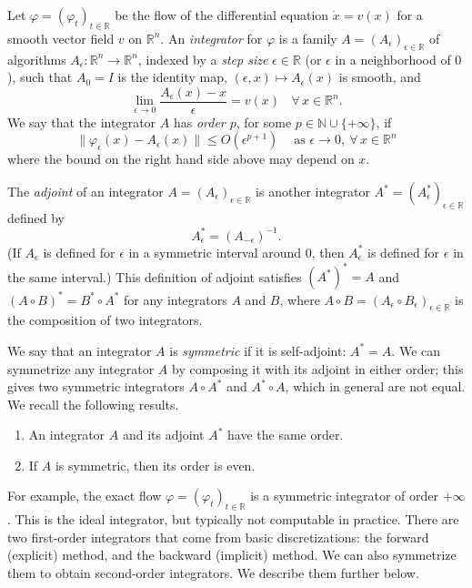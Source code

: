 \documentclass[final,12pt]{colt2018}
\newcommand{\R}{\mathbb{R}}
\newcommand{\bN}{\mathbb{N}}
\begin{document}
Let $\varphi = (\varphi_t)_{t \in \R}$ be the flow of the differential equation $\dot x = v(x)$ for a smooth vector field $v$ on $\R^n$.
An {\em integrator} for $\varphi$ is a family $A = (A_\epsilon)_{\epsilon \in \R}$ of algorithms $A_\epsilon \colon \R^n \to \R^n$, indexed by a {\em step size} $\epsilon \in \R$ (or $\epsilon$ in a neighborhood of $0$), such that
$A_0 = I$ is the identity map, $(\epsilon,x) \mapsto A_\epsilon(x)$ is smooth, and 
$$\lim_{\epsilon \to 0} \frac{A_\epsilon(x)-x}{\epsilon} = v(x) ~~~~ \forall \, x \in \R^n.$$
We say that the integrator $A$ has {\em order $p$}, for some $p \in \bN \cup \{+\infty\}$, if
$$\|\varphi_\epsilon(x) - A_\epsilon(x)\| \le O(\epsilon^{p+1})~~~~\text{ as } \epsilon \to 0, ~ \forall\, x \in \R^n$$
where the bound on the right hand side above may depend on $x$.

The {\em adjoint} of an integrator $A = (A_\epsilon)_{\epsilon \in \R}$ is another integrator $A^\ast = (A_\epsilon^\ast)_{\epsilon \in \R}$ defined by
$$A_\epsilon^\ast = (A_{-\epsilon})^{-1}.$$
(If $A_\epsilon$ is defined for $\epsilon$ in a symmetric interval around $0$, then $A_\epsilon^\ast$ is defined for $\epsilon$ in the same interval.)
This definition of adjoint satisfies $(A^\ast)^\ast = A$ and $(A \circ B)^\ast = B^\ast \circ A^\ast$ for any integrators $A$ and $B$, where $A \circ B = (A_{\epsilon} \circ B_{\epsilon})_{\epsilon \in \R}$ is the composition of two integrators. 

We say that an integrator $A$ is {\em symmetric} if it is self-adjoint: $A^\ast = A.$
We can symmetrize any integrator $A$ by composing it with its adjoint in either order; this gives two symmetric integrators $A \circ A^\ast$ and $A^\ast \circ A$, which in general are not equal.
We recall the following results.

\begin{lemma}
\label{Lem:Int}
\begin{enumerate}
\item An integrator $A$ and its adjoint $A^\ast$ have the same order.
\item If $A$ is symmetric, then its order is even.
\end{enumerate}
\end{lemma}

For example, the exact flow $\varphi = (\varphi_t)_{t \in \R}$ is a symmetric integrator of order $+ \infty$.
This is the ideal integrator, but typically not computable in practice.
There are two first-order integrators that come from basic discretizations: the forward (explicit) method, and the backward (implicit) method.
We can also symmetrize them to obtain second-order integrators.
We describe them further below.
\end{document}
